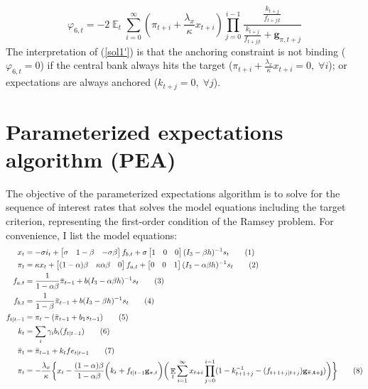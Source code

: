 \documentclass[11pt]{article}
\renewcommand{\[}{\begin{equation}}
\renewcommand{\]}{\end{equation}}
\DeclareMathOperator{\E}{\mathbb{E}}
\newcommand\numberthis{\addtocounter{equation}{1}\tag{\theequation}} %
\begin{document}
\begin{equation}
\varphi_{6,t} = -2\E_t\sum_{i=0}^{\infty}(\pi_{t+i}+\frac{\lambda_x}{\kappa}x_{t+i})\prod_{j=0}^{i-1}\frac{\frac{k_{t+j}}{f_{t+j|t}}}{\frac{k_{t+j}}{f_{t+j|t}} + \mathbf{g}_{\pi,t+j}} \label{sol1'}
\end{equation}
The interpretation of (\ref{sol1'}) is that the anchoring constraint is not binding ($\varphi_{6,t}=0$) if the central bank always hits the target ($\pi_{t+i}+\frac{\lambda_x}{\kappa}x_{t+i} = 0, \; \forall i$); or expectations are always anchored ($k_{t+j}=0, \; \forall j$). 

\section{Parameterized expectations algorithm (PEA)} \label{pea}
The objective of the parameterized expectations algorithm is to solve for the sequence of interest rates that solves the model equations including the target criterion, representing the first-order condition of the Ramsey problem. For convenience, I list the model equations:
\begin{align*}
x_t &=  -\sigma i_t + \begin{bmatrix} \sigma & 1-\beta & -\sigma\beta \end{bmatrix} f_{b,t} + \sigma \begin{bmatrix} 1 & 0 & 0 \end{bmatrix} (I_{3} - \beta h)^{-1} s_t \label{A9} \numberthis \\
\pi_t &= \kappa x_t  + \begin{bmatrix} (1-\alpha)\beta & \kappa\alpha\beta & 0 \end{bmatrix}  f_{a,t} + \begin{bmatrix} 0 & 0 & 1 \end{bmatrix}  (I_{3} - \alpha \beta h)^{-1}  s_t \label{A10} \numberthis\\
f_{a,t} & = \frac{1}{1-\alpha\beta}\bar{\pi}_{t-1}  + b(I_{3} - \alpha\beta h)^{-1}s_t \numberthis \\
f_{b,t} & = \frac{1}{1-\beta}\bar{\pi}_{t-1}  + b(I_{3} - \beta h)^{-1}s_t  \label{A8} \numberthis \\
 f_{t|t-1} &  = \pi_t - (\bar{\pi}_{t-1}+b_1 s_{t-1}) \label{A7} \numberthis \\
 k_t & = \sum_i \gamma_i b_i(f_{t|t-1}) \numberthis  \\
 \bar{\pi}_{t} &  = \bar{\pi}_{t-1} +k_tfe_{t|t-1} \numberthis \\
 \pi_t & = -\frac{\lambda_x}{\kappa}\bigg\{x_t - \frac{(1-\alpha)\beta}{1-\alpha\beta} \bigg(k_t+f_{t|t-1}\mathbf{g}_{\pi,t} \bigg) \bigg(\E_t\sum_{i=1}^{\infty}x_{t+i}\prod_{j=0}^{i-1}(1-k_{t+1+j}^{-1} - (f_{t+1+j|t+j})\mathbf{g_{\bar{\pi}, t+j}}) \bigg)
\bigg\} \numberthis \label{B1}
\end{align*}
\end{document}
